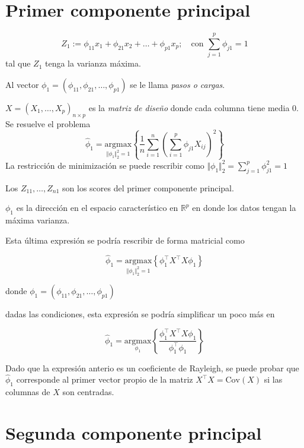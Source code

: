 \documentclass[
  12pt,
]{book}
\theoremstyle{definition}
\theoremstyle{definition}
\theoremstyle{definition}
\theoremstyle{remark}
\begin{document}
\hypertarget{primer-componente-principal}{%
\section{Primer componente principal}\label{primer-componente-principal}}

\[ Z_1 := \phi_{11}x_1 +  \phi_{21}x_2 + \dots + \phi_{p1}x_p;\quad \text{con } \sum_{j=1}^{p}\phi_{j1} = 1\]
tal que \(Z_1\) tenga la varianza máxima.

Al vector \(\phi_1 = (\phi_{11}, \phi_{21},\dots,\phi_{p1})\) se le llama \emph{pasos o cargas}.

\(X = (X_1,\dots,X_p)_{n\times p}\) es la \emph{matriz de diseño} donde cada columna tiene media 0. Se resuelve el problema
\[\hat{\phi}_1=\underset{\Vert\phi_1\Vert_2^2=1}{\mathrm{argmax}} \left\lbrace\dfrac{1}{n}\sum_{i=1}^{n}\left(\sum_{i=1}^p \phi_{j1} X_{ij} \right)^2 \right\rbrace \]
La restricción de minimización se puede rescribir como \(\Vert\phi_1\Vert_2^2= \sum_{j=1}^p \phi_{j1}^2 = 1\)

Los \(Z_{11},\dots, Z_{n1}\) son los scores del primer componente principal.

\(\phi_1\) es la dirección en el espacio característico en \(\mathbb{R}^p\) en donde los datos tengan la máxima varianza.

Esta última expresión se podría rescribir de forma matricial como

\[
\hat{\phi}_1 = \underset{\Vert\phi_1\Vert_2^2=1}{\mathrm{argmax}} \left\{ \phi_1^\top X^\top X \phi_1 \right\}
\]

donde \(\phi_1 = (\phi_{11}, \phi_{21},\dots,\phi_{p1})\)

dadas las condiciones, esta expresión se podría simplificar un poco más en

\[
\hat{\phi}_1 = \underset{\phi_1}{\mathrm{argmax}} \left\{\frac{\phi_1^\top X^\top X \phi_1 }{\phi_1^\top \phi_1}\right\}
\]

Dado que la expresión anterio es un coeficiente de Rayleigh, se puede probar que \(\hat{\phi}_{1}\) corresponde al primer vector propio de la matriz \(X^\top X = \mathrm{Cov}(X)\) si las columnas de \(X\) son centradas.

\hypertarget{segunda-componente-principal}{%
\section{Segunda componente principal}\label{segunda-componente-principal}}
\end{document}
